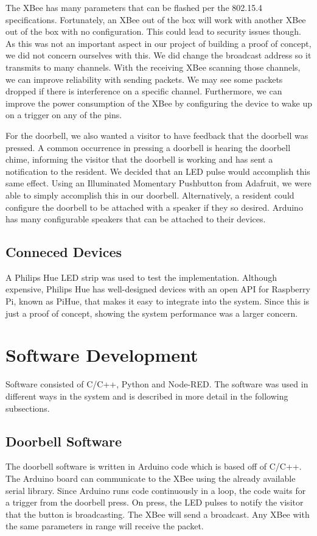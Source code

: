     The XBee has many parameters that can be flashed per the 802.15.4 specifications. Fortunately, an XBee out of the box will work with another XBee out of the box with no configuration. This could lead to security issues though. As this was not an important aspect in our project of building a proof of concept, we did not concern ourselves with this. We did change the broadcast address so it transmits to many channels. With the receiving XBee scanning those channels, we can improve reliability with sending packets. We may see some packets dropped if there is interference on a specific channel. Furthermore, we can improve the power consumption of the XBee by configuring the device to wake up on a trigger on any of the pins.
    
    For the doorbell, we also wanted a visitor to have feedback that the doorbell was pressed. A common occurrence in pressing a doorbell is hearing the doorbell chime, informing the visitor that the doorbell is working and has sent a notification to the resident. We decided that an LED pulse would accomplish this same effect. Using an Illuminated Momentary Pushbutton from Adafruit, we were able to simply accomplish this in our doorbell. Alternatively, a resident could configure the doorbell to be attached with a speaker if they so desired. Arduino has many configurable speakers that can be attached to their devices.

\subsection{Conneced Devices}
A Philips Hue LED strip was used to test the implementation. Although expensive, Philips Hue has well-designed devices with an open API for Raspberry Pi, known as PiHue, that makes it easy to integrate into the system. Since this is just a proof of concept, showing the system performance was a larger concern.

\section{Software Development}
Software consisted of C/C++, Python and Node-RED. The software was used in different ways in the system and is described in more detail in the following subsections.

\subsection{Doorbell Software}
The doorbell software is written in Arduino code which is based off of C/C++. The Arduino board can communicate to the XBee using the already available serial library. Since Arduino runs code continuously in a loop, the code waits for a trigger from the doorbell press. On press, the LED pulses to notify the visitor that the button is broadcasting. The XBee will send a broadcast. Any XBee with the same parameters in range will receive the packet.

